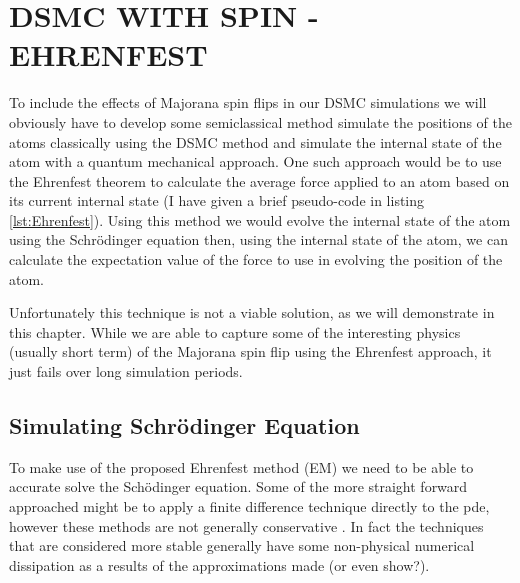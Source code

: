 
\chapter{DSMC WITH SPIN - EHRENFEST} %

\label{ch:dsmcehr} %

To include the effects of Majorana spin flips in our DSMC simulations we will obviously have to develop some semiclassical method \ie simulate the positions of the atoms classically using the DSMC method and simulate the internal state of the atom with a quantum mechanical approach.
One such approach would be to use the Ehrenfest theorem \cite{Ehrenfest1927} to calculate the average force applied to an atom based on its current internal state (I have given a brief pseudo-code in listing \ref{lst:Ehrenfest}).
Using this method we would evolve the internal state of the atom using the Schr\"odinger equation then, using the internal state of the atom, we can calculate the expectation value of the force to use in evolving the position of the atom.

Unfortunately this technique is not a viable solution, as we will demonstrate in this chapter.
While we are able to capture some of the interesting physics (usually short term) of the Majorana spin flip using the Ehrenfest approach, it just fails over long simulation periods.



\section{Simulating Schr\"odinger Equation}

To make use of the proposed Ehrenfest method (EM) we need to be able to accurate solve the Sch\"odinger equation.
Some of the more straight forward approached might be to apply a finite difference technique directly to the pde, however these methods are not generally conservative \cite{?}.
In fact the techniques that are considered more stable generally have some non-physical numerical dissipation as a results of the approximations made \cite{?} (or even show?).


